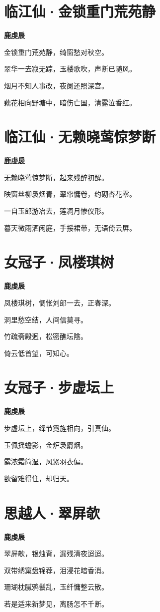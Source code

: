 \documentclass[12pt,a4paper]{ctexbook}
\begin{document}
\section{临江仙·金锁重门荒苑静}
\textbf{鹿虔扆}\par\vspace{0.5em}
金锁重门荒苑静，绮窗愁对秋空。\par
翠华一去寂无踪，玉楼歌吹，声断已随风。\par
烟月不知人事改，夜阑还照深宫。\par
藕花相向野塘中，暗伤亡国，清露泣香红。\par

\section{临江仙·无赖晓莺惊梦断}
\textbf{鹿虔扆}\par\vspace{0.5em}
无赖晓莺惊梦断，起来残醉初醒。\par
映窗丝柳袅烟青，翠帘慵卷，约砌杏花零。\par
一自玉郎游冶去，莲凋月惨仪形。\par
暮天微雨洒闲庭，手挼裙带，无语倚云屏。\par

\section{女冠子·凤楼琪树}
\textbf{鹿虔扆}\par\vspace{0.5em}
凤楼琪树，惆怅刘郎一去，正春深。\par
洞里愁空结，人间信莫寻。\par
竹疏斋殿迥，松密醮坛陰。\par
倚云低首望，可知心。\par

\section{女冠子·步虚坛上}
\textbf{鹿虔扆}\par\vspace{0.5em}
步虚坛上，绛节霓旌相向，引真仙。\par
玉佩摇蟾影，金炉袅麝烟。\par
露浓霜简湿，风紧羽衣偏。\par
欲留难得住，却归天。\par

\section{思越人·翠屏欹}
\textbf{鹿虔扆}\par\vspace{0.5em}
翠屏欹，银烛背，漏残清夜迢迢。\par
双带绣窠盘锦荐，泪浸花暗香消。\par
珊瑚枕腻鸦鬟乱，玉纤慵整云散。\par
若是适来新梦见，离肠怎不千断。\par
\end{document}
